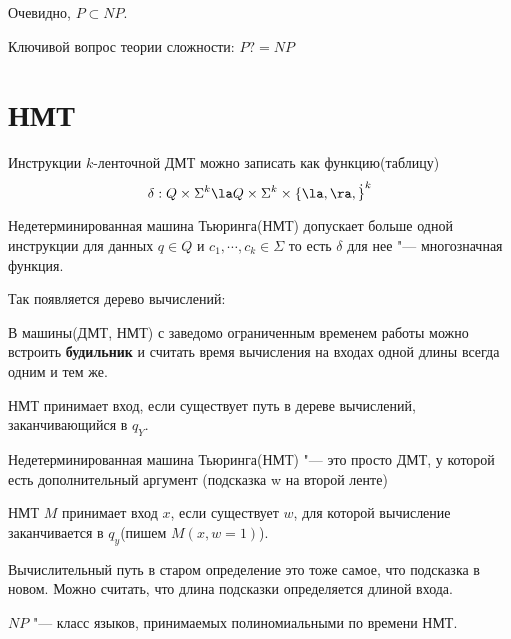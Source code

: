 Очевидно, $P \subset NP$.

\begin{Rem}
Ключивой вопрос теории сложности: $P ?= NP$
\end{Rem}

\section{НМТ}
Инструкции $k$-ленточной ДМТ можно записать как
функцию(таблицу)
$$\delta: Q \times \Sigma^k \la Q \times \Sigma^k 
\times \{\la, \ra, \dot\}^k$$
\begin{Def}
Недетерминированная машина Тьюринга(НМТ)
допускает больше одной инструкции для данных
$q \in Q$ и $c_1, \cdots, c_k \in \Sigma$ то есть
$\delta$ для нее "--- многозначная функция.
\end{Def}

Так появляется дерево вычислений:

\begin{Def}
В машины(ДМТ, НМТ) с заведомо ограниченным
временем работы можно встроить \textbf{будильник} и считать 
время вычисления на входах одной 
длины всегда одним и тем же. 

НМТ принимает вход, если существует 
путь в дереве вычислений, заканчивающийся в $q_Y$.
\end{Def}

\begin{Def}
Недетерминированная машина Тьюринга(НМТ) "--- это просто ДМТ,
у которой есть дополнительный аргумент (подсказка w на второй ленте)

НМТ $M$ принимает вход $x$, если существует $w$, для которой 
вычисление заканчивается в $q_y$(пишем $M(x, w = 1)$).\\
\end{Def}

Вычислительный путь в старом определение это тоже
самое, что подсказка в новом. Можно считать, что 
длина подсказки определяется длиной входа. 

\begin{Def}
$NP$ "--- класс языков, принимаемых полиномиальными 
по времени НМТ.
\end{Def}

